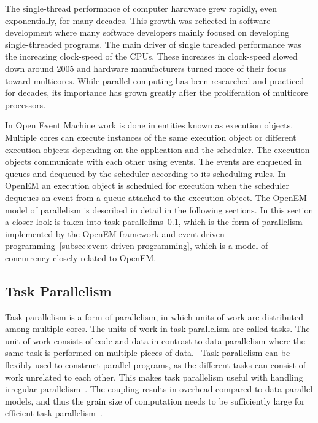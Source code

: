 The single-thread performance of computer hardware grew rapidly, even exponentially, for many decades. This growth was reflected in software development where many software developers mainly focused on developing single-threaded programs. The main driver of single threaded performance was the increasing clock-speed of the CPUs. These increases in clock-speed slowed down around 2005 and hardware manufacturers turned more of their focus toward multicores. While parallel computing has been researched and practiced for decades, its importance has grown greatly after the proliferation of multicore processors.~\cite{sutter2005free}

In Open Event Machine work is done in entities known as execution objects. Multiple cores can execute instances of the same execution object or different execution objects depending on the application and the scheduler. The execution objects communicate with each other using events. The events are enqueued in queues and dequeued by the scheduler according to its scheduling rules. In OpenEM an execution object is scheduled for execution when the scheduler dequeues an event from a queue attached to the execution object. The OpenEM model of parallelism is described in detail in the following sections. In this section a closer look is taken into task parallelims~\ref{subsec:task-parallelism}, which is the form of parallelism implemented by the OpenEM framework and event-driven programming~\ref{subsec:event-driven-programming}, which is a model of concurrency closely related to OpenEM.

\subsection{Task Parallelism}
\label{subsec:task-parallelism}
Task parallelism is a form of parallelism, in which units of work are distributed among multiple cores. The units of work in task parallelism are called tasks. The unit of work consists of code and data in contrast to data parallelism where the same task is performed on multiple pieces of data.~\cite{hennessy2011computer} Task parallelism can be flexibly used to construct parallel programs, as the different tasks can consist of work unrelated to each other. This makes task parallelism useful with handling irregular parallelism~\cite{ayguade2009design}. The coupling results in overhead compared to data parallel models, and thus the grain size of computation needs to be sufficiently large for efficient task parallelism~\cite{subhlok1993exploiting}.

